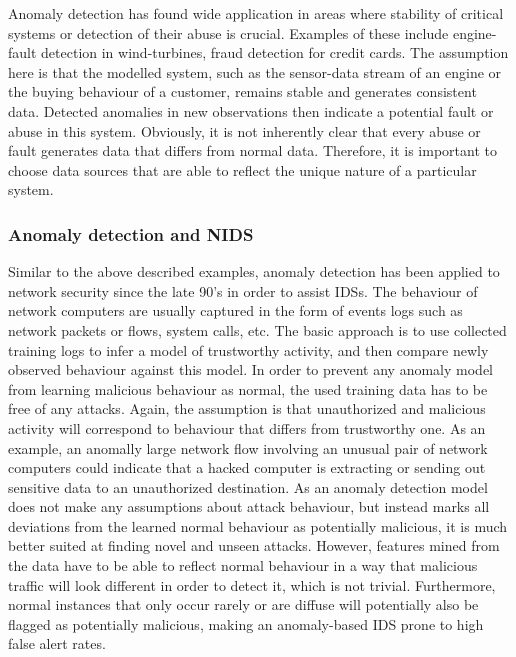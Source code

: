 \documentclass[a4paper,12pt,twoside]{report}
\begin{document}
Anomaly detection has found wide application in areas where stability of  critical systems or detection of their abuse is crucial. Examples of these include engine-fault detection in wind-turbines, fraud detection for credit cards. The assumption here is that the modelled system, such as the sensor-data stream of an engine or the buying behaviour of a customer, remains stable and generates consistent data. Detected anomalies in new observations then indicate a potential fault or abuse in this system. Obviously, it is not inherently clear that every abuse or fault generates data that differs from normal data. Therefore, it is important to choose data sources that are able to reflect the unique nature of a particular system.

\subsubsection{Anomaly detection and NIDS}

Similar to the above described examples, anomaly detection has been applied to network security since the late 90's in order to assist IDSs. The behaviour of network computers are usually captured in the form of events logs such as network packets or flows, system calls, etc. The basic approach is to use collected training logs to infer a model of trustworthy activity, and then compare newly observed behaviour against this model. In order to prevent any anomaly model from learning malicious behaviour as normal, the used training data has to be free of any attacks. 
Again, the assumption is that unauthorized and malicious activity will correspond to behaviour that differs from trustworthy one. As an example, an anomally large network flow involving an unusual pair of network computers could indicate that a hacked computer is extracting or sending out sensitive data to an unauthorized destination. As an anomaly detection model does not make any assumptions about attack behaviour, but instead marks all deviations from the learned normal behaviour as potentially malicious, it is much better suited at finding novel and unseen attacks. However, features mined from the data have to be able to reflect normal behaviour in a way that malicious traffic will look different in order to detect it, which is not trivial. Furthermore, normal instances that only occur rarely or are diffuse will potentially also be flagged as potentially malicious, making an anomaly-based IDS prone to high false alert rates.
\end{document}
